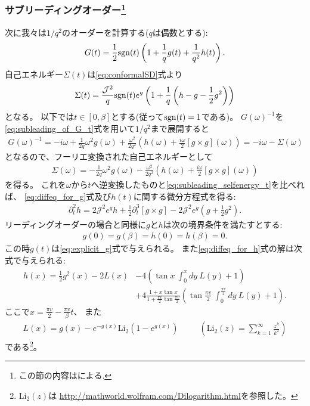 \subsubsection{サブリーディングオーダー\footnote{この節の内容は\cite{tarnopolsky}による.}}
次に我々は$1/q^2$のオーダーを計算する($q$は偶数とする):
\begin{align}
	G(t) = \frac{1}{2}\mathrm{sgn}(t)\left(1 + \frac{1}{q}g(t) + \frac{1}{q^2}h(t)\right).
	\label{eq:subleading_of_G_t}
\end{align}
自己エネルギー$\Sigma(t)$は\eqref{eq:conformalSD}式より
\begin{align}
	\Sigma(t) = \frac{\mathcal{J}^2}{q}\mathrm{sgn}(t)e^g
		\left(
			1 + \frac{1}{q}\left(h - g - \frac{1}{2}g^2\right)
		\right)
	\label{eq:subleading_selfenergy_t}
\end{align}
となる。
以下では$t \in [0, \beta]$とする(従って$\mathrm{sgn}(t) = 1$である)。
$G(\omega)^{-1}$を\eqref{eq:subleading_of_G_t}式を用いて$1/q^2$まで展開すると
\begin{align}
	G(\omega)^{-1} = -i\omega + \frac{1}{2q}\omega^2 g(\omega)
		+ \frac{\omega^2}{2q^2}\left(
			h(\omega) + \frac{i\omega}{2}[g \times g](\omega)
		\right)
		= -i\omega - \Sigma(\omega)
\end{align}
となるので、フーリエ変換された自己エネルギーとして
\begin{align}
	\Sigma(\omega) = -\frac{1}{2q}\omega^2 g(\omega) - \frac{\omega^2}{2q^2}\left(
			h(\omega) + \frac{i\omega}{2}[g \times g](\omega)
		\right)
\end{align}
を得る。
これを$\omega$から$t$へ逆変換したものと\eqref{eq:subleading_selfenergy_t}を比べれば、
\eqref{eq:diffeq_for_g}式及び$h(t)$に関する微分方程式を得る:
\begin{align}
	\partial_t^2 h = 2 \mathcal{J}^2 e^g h + \frac{1}{2}\partial_t^3[g \times g]
		- 2\mathcal{J}^2 e^g \left(g + \frac{1}{2}g^2\right)
	\label{eq:diffeq_for_h}.
\end{align}
リーディングオーダーの場合と同様に$g$と$h$は次の境界条件を満たすとする:
\begin{align}
	g(0) = g(\beta) = h(0) = h(\beta) = 0.
\end{align}
この時$g(t)$は\eqref{eq:explicit_g}式で与えられる。
また\eqref{eq:diffeq_for_h}式の解は次式で与えられる:
\begin{align}
	h(x) = \frac{1}{2}g^2(x) - 2L(x)
		&- 4\left(\tan x\ \int_0^x dy\ L(y) + 1\right)\nonumber\\
		&+ 4\frac{1 + x\tan x}{1 + \frac{\pi v}{2}\tan \frac{\pi v}{2}}\left(
			\tan \frac{\pi v}{2}\ \int_0^{\frac{\pi v}{2}} dy\ L(y) + 1
		\right).
	\label{eq:explicit_h}
\end{align}
ここで$x = \frac{\pi v}{2} - \frac{\pi v}{\beta}t$、
また
\begin{align}
	L(x) = g(x) - e^{-g(x)}\mathrm{Li}_2(1 - e^{g(x)})
	\hspace{30pt}
	\left(\mathrm{Li}_2(z) = \sum_{k=1}^{\infty}\frac{z^k}{k^2}\right)
\end{align}
である\footnote{$\mathrm{Li}_2(z)$は
\href{http://mathworld.wolfram.com/Dilogarithm.html}{http://mathworld.wolfram.com/Dilogarithm.html}を参照した。}。

